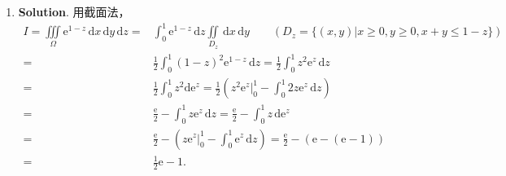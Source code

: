 \documentclass[../Main.tex]{subfiles}
\begin{document}
\begin{enumerate}
    \item \textbf{Solution}. 用截面法，
          \[
              \begin{aligned}
                  I = \iiint\limits_{\Omega}\mathrm{e}^{1-z}\,\mathrm{d}x\,\mathrm{d}y\,\mathrm{d}z = & \int_{0}^{1}\mathrm{e}^{1-z}\,\mathrm{d}z\iint\limits_{D_z}\,\mathrm{d}x\,\mathrm{d}y \qquad \left(D_{z}=\{(x,y)|x\geq 0,y\geq 0,x+y\leq 1-z\}\right)                           \\
                  =                                                                                   & \frac{1}{2}\int_{0}^{1}(1-z)^{2}\mathrm{e}^{1-z}\,\mathrm{d}z = \frac{1}{2}\int_{0}^{1}z^{2}\mathrm{e}^{z}\,\mathrm{d}z                                                         \\
                  =                                                                                   & \frac{1}{2}\int_{0}^{1}z^{2} \mathrm{d}\mathrm{e}^{z}= \frac{1}{2}\left(z^{2}\mathrm{e}^{z}\Big|_{0}^{1}-\int_{0}^{1}2z\mathrm{e}^{z}\,\mathrm{d}z\right)                       \\
                  =                                                                                   & \frac{\mathrm{e}}{2}-\int_{0}^{1}z\mathrm{e}^{z}\,\mathrm{d}z = \frac{\mathrm{e}}{2}-\int_{0}^{1}z\,\mathrm{d}\mathrm{e}^{z}                                                    \\
                  =                                                                                   & \frac{\mathrm{e}}{2}-\left(z\mathrm{e}^{z}\Big|_{0}^{1}-\int_{0}^{1}\mathrm{e}^{z}\,\mathrm{d}z\right) = \frac{\mathrm{e}}{2}-\left(\mathrm{e}-\left(\mathrm{e}-1\right)\right) \\
                  =                                                                                   & \frac{1}{2}\mathrm{e}-1.
              \end{aligned}
          \]
\end{enumerate}
\end{document}
